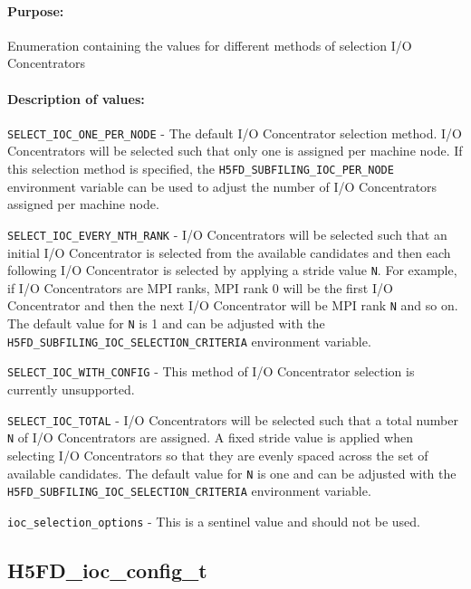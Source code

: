 \documentclass[../main.tex]{subfiles}
\begin{document}
\paragraph{Purpose:}
\begin{flushleft}%
Enumeration containing the values for different methods of selection I/O Concentrators
\end{flushleft}%

\paragraph{Description of values:}
\begin{flushleft}%
\texttt{SELECT\_IOC\_ONE\_PER\_NODE} - The default I/O Concentrator selection method. I/O
Concentrators will be selected such that only one is assigned per machine node. If this
selection method is specified, the \texttt{H5FD\_SUBFILING\_IOC\_PER\_NODE} environment
variable can be used to adjust the number of I/O Concentrators assigned per machine node.

\texttt{SELECT\_IOC\_EVERY\_NTH\_RANK} - I/O Concentrators will be selected such that an
initial I/O Concentrator is selected from the available candidates and then each following
I/O Concentrator is selected by applying a stride value \texttt{N}. For example, if I/O
Concentrators are MPI ranks, MPI rank 0 will be the first I/O Concentrator and then the
next I/O Concentrator will be MPI rank \texttt{N} and so on. The default value for
\texttt{N} is 1 and can be adjusted with the \texttt{H5FD\_SUBFILING\_IOC\_SELECTION\_CRITERIA}
environment variable.

\texttt{SELECT\_IOC\_WITH\_CONFIG} - This method of I/O Concentrator selection is currently
unsupported.

\texttt{SELECT\_IOC\_TOTAL} - I/O Concentrators will be selected such that a total number
\texttt{N} of I/O Concentrators are assigned. A fixed stride value is applied when selecting
I/O Concentrators so that they are evenly spaced across the set of available candidates. The
default value for \texttt{N} is one and can be adjusted with the
\texttt{H5FD\_SUBFILING\_IOC\_SELECTION\_CRITERIA} environment variable.

\texttt{ioc\_selection\_options} - This is a sentinel value and should not be used.
\end{flushleft}%

\newpage

\subsection{H5FD\_ioc\_config\_t}
\label{ref:h5fd_ioc_config_t}
\end{document}
